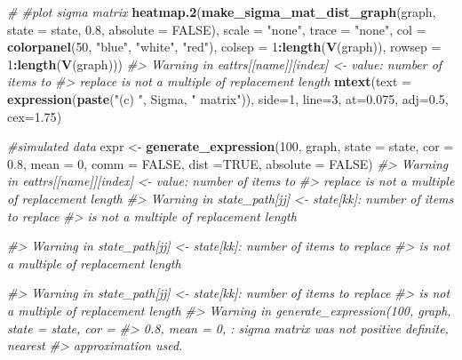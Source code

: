 \documentclass[]{article}
\newenvironment{Shaded}{\begin{snugshade}}{\end{snugshade}}
\newcommand{\CommentTok}[1]{\textcolor[rgb]{0.56,0.35,0.01}{\textit{#1}}}
\newcommand{\DataTypeTok}[1]{\textcolor[rgb]{0.13,0.29,0.53}{#1}}
\newcommand{\DecValTok}[1]{\textcolor[rgb]{0.00,0.00,0.81}{#1}}
\newcommand{\FloatTok}[1]{\textcolor[rgb]{0.00,0.00,0.81}{#1}}
\newcommand{\KeywordTok}[1]{\textcolor[rgb]{0.13,0.29,0.53}{\textbf{#1}}}
\newcommand{\NormalTok}[1]{#1}
\newcommand{\OperatorTok}[1]{\textcolor[rgb]{0.81,0.36,0.00}{\textbf{#1}}}
\newcommand{\OtherTok}[1]{\textcolor[rgb]{0.56,0.35,0.01}{#1}}
\newcommand{\StringTok}[1]{\textcolor[rgb]{0.31,0.60,0.02}{#1}}
\begin{document}
\begin{Shaded}
\begin{Highlighting}[]
{\CommentTok{# #plot sigma matrix}
\KeywordTok{heatmap.2}\NormalTok{(}\KeywordTok{make_sigma_mat_dist_graph}\NormalTok{(graph, }\DataTypeTok{state =}\NormalTok{ state, }\FloatTok{0.8}\NormalTok{, }\DataTypeTok{absolute =} \OtherTok{FALSE}\NormalTok{),}
\DataTypeTok{scale =} \StringTok{"none"}\NormalTok{, }\DataTypeTok{trace =} \StringTok{"none"}\NormalTok{, }\DataTypeTok{col =} \KeywordTok{colorpanel}\NormalTok{(}\DecValTok{50}\NormalTok{, }\StringTok{"blue"}\NormalTok{, }\StringTok{"white"}\NormalTok{, }\StringTok{"red"}\NormalTok{),}
\DataTypeTok{colsep =} \DecValTok{1}\OperatorTok{:}\KeywordTok{length}\NormalTok{(}\KeywordTok{V}\NormalTok{(graph)), }\DataTypeTok{rowsep =} \DecValTok{1}\OperatorTok{:}\KeywordTok{length}\NormalTok{(}\KeywordTok{V}\NormalTok{(graph)))}
\CommentTok{#> Warning in eattrs[[name]][index] <- value: number of items to}
\CommentTok{#> replace is not a multiple of replacement length}
\KeywordTok{mtext}\NormalTok{(}\DataTypeTok{text =} \KeywordTok{expression}\NormalTok{(}\KeywordTok{paste}\NormalTok{(}\StringTok{"(c) "}\NormalTok{, Sigma, }\StringTok{" matrix"}\NormalTok{)), }\DataTypeTok{side=}\DecValTok{1}\NormalTok{, }\DataTypeTok{line=}\DecValTok{3}\NormalTok{, }\DataTypeTok{at=}\FloatTok{0.075}\NormalTok{, }\DataTypeTok{adj=}\FloatTok{0.5}\NormalTok{, }\DataTypeTok{cex=}\FloatTok{1.75}\NormalTok{)}

\CommentTok{#simulated data}
\NormalTok{expr <-}\StringTok{ }\KeywordTok{generate_expression}\NormalTok{(}\DecValTok{100}\NormalTok{, graph,  }\DataTypeTok{state =}\NormalTok{ state, }\DataTypeTok{cor =} \FloatTok{0.8}\NormalTok{, }\DataTypeTok{mean =} \DecValTok{0}\NormalTok{,}
\DataTypeTok{comm =} \OtherTok{FALSE}\NormalTok{, }\DataTypeTok{dist =}\OtherTok{TRUE}\NormalTok{, }\DataTypeTok{absolute =} \OtherTok{FALSE}\NormalTok{)}
\CommentTok{#> Warning in eattrs[[name]][index] <- value: number of items to}
\CommentTok{#> replace is not a multiple of replacement length}
\CommentTok{#> Warning in state_path[jj] <- state[kk]: number of items to replace}
\CommentTok{#> is not a multiple of replacement length}

\CommentTok{#> Warning in state_path[jj] <- state[kk]: number of items to replace}
\CommentTok{#> is not a multiple of replacement length}

\CommentTok{#> Warning in state_path[jj] <- state[kk]: number of items to replace}
\CommentTok{#> is not a multiple of replacement length}
\CommentTok{#> Warning in generate_expression(100, graph, state = state, cor =}
\CommentTok{#> 0.8, mean = 0, : sigma matrix was not positive definite, nearest}
\CommentTok{#> approximation used.}

}
\end{Highlighting}
\end{Shaded}
\end{document}
